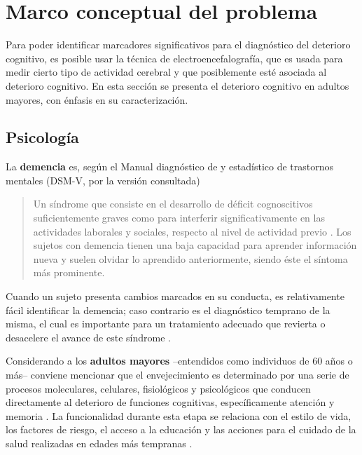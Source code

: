 
\chapter{Marco conceptual del problema}

Para poder identificar marcadores significativos para el diagnóstico del deterioro cognitivo, es 
posible usar la técnica de electroencefalografía, que es usada para medir cierto tipo de actividad 
cerebral y que posiblemente esté asociada al deterioro cognitivo. 
%
En esta sección se presenta el deterioro cognitivo en adultos mayores, con énfasis en su 
caracterización.


\section{Psicología}

La \textbf{demencia} es, según el Manual diagnóstico de y estadístico de trastornos mentales 
(DSM-V, por la versión consultada)
\begin{quote}
Un síndrome que consiste en el desarrollo de déficit cognoscitivos suficientemente graves como para 
interferir significativamente en las actividades laborales y sociales, respecto al nivel de 
actividad previo \cite{DCM5}.
%
Los sujetos con demencia tienen una baja capacidad para aprender información nueva y suelen olvidar 
lo aprendido anteriormente, siendo éste el síntoma más prominente.
\end{quote}

Cuando un sujeto presenta cambios marcados en su conducta, es relativamente fácil identificar la 
demencia; caso contrario es el diagnóstico temprano de la misma, el cual es importante para un 
tratamiento adecuado que revierta o desacelere el avance de este síndrome \cite{Knopman01}.

Considerando a los \textbf{adultos mayores} --entendidos como individuos de 60 años o más--
conviene mencionar que el envejecimiento es determinado por una serie de procesos moleculares, 
celulares, fisiológicos y psicológicos que conducen directamente al deterioro de funciones 
cognitivas, específicamente atención y memoria \cite{Park09}.
%
La funcionalidad durante esta etapa se relaciona con el estilo de vida, los factores de riesgo, el 
acceso a la educación y las acciones para el cuidado de la salud realizadas en edades más 
tempranas \cite{Sanhueza14}.

